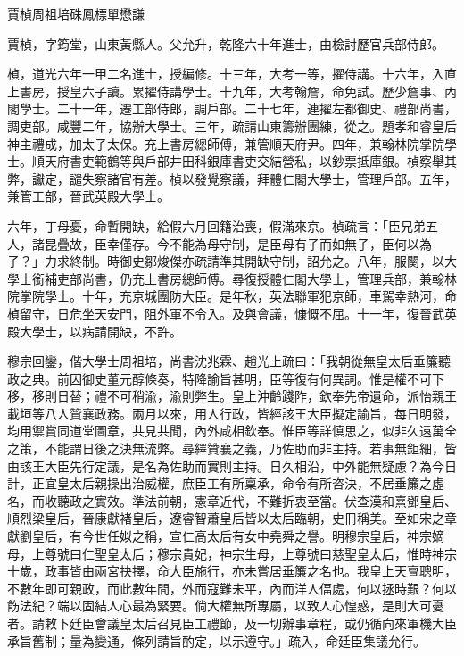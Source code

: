 
\begin{pinyinscope}
賈楨周祖培硃鳳標單懋謙

賈楨，字筠堂，山東黃縣人。父允升，乾隆六十年進士，由檢討歷官兵部侍郎。

楨，道光六年一甲二名進士，授編修。十三年，大考一等，擢侍講。十六年，入直上書房，授皇六子讀。累擢侍講學士。十九年，大考翰詹，命免試。歷少詹事、內閣學士。二十一年，遷工部侍郎，調戶部。二十七年，連擢左都御史、禮部尚書，調吏部。咸豐二年，協辦大學士。三年，疏請山東籌辦團練，從之。題孝和睿皇后神主禮成，加太子太保。充上書房總師傅，兼管順天府尹。四年，兼翰林院掌院學士。順天府書吏範鶴等與戶部井田科銀庫書吏交結營私，以鈔票抵庫銀。楨察舉其弊，讞定，譴失察諸官有差。楨以發覺察議，拜體仁閣大學士，管理戶部。五年，兼管工部，晉武英殿大學士。

六年，丁母憂，命暫開缺，給假六月回籍治喪，假滿來京。楨疏言：「臣兄弟五人，諸昆疊故，臣幸僅存。今不能為母守制，是臣母有子而如無子，臣何以為子？」力求終制。時御史鄒焌傑亦疏請準其開缺守制，詔允之。八年，服闋，以大學士銜補吏部尚書，仍充上書房總師傅。尋復授體仁閣大學士，管理兵部，兼翰林院掌院學士。十年，充京城團防大臣。是年秋，英法聯軍犯京師，車駕幸熱河，命楨留守，日危坐天安門，阻外軍不令入。及與會議，慷慨不屈。十一年，復晉武英殿大學士，以病請開缺，不許。

穆宗回鑾，偕大學士周祖培，尚書沈兆霖、趙光上疏曰：「我朝從無皇太后垂簾聽政之典。前因御史董元醇條奏，特降諭旨甚明，臣等復有何異詞。惟是權不可下移，移則日替；禮不可稍渝，渝則弊生。皇上沖齡踐阼，欽奉先帝遺命，派怡親王載垣等八人贊襄政務。兩月以來，用人行政，皆經該王大臣擬定諭旨，每日明發，均用禦賞同道堂圖章，共見共聞，內外咸相欽奉。惟臣等詳慎思之，似非久遠萬全之策，不能謂日後之決無流弊。尋繹贊襄之義，乃佐助而非主持。若事無鉅細，皆由該王大臣先行定議，是名為佐助而實則主持。日久相沿，中外能無疑慮？為今日計，正宜皇太后親操出治威權，庶臣工有所稟承，命令有所咨決，不居垂簾之虛名，而收聽政之實效。準法前朝，憲章近代，不難折衷至當。伏查漢和熹鄧皇后、順烈梁皇后，晉康獻褚皇后，遼睿智蕭皇后皆以太后臨朝，史冊稱美。至如宋之章獻劉皇后，有今世任姒之稱，宣仁高太后有女中堯舜之譽。明穆宗皇后，神宗嫡母，上尊號曰仁聖皇太后；穆宗貴妃，神宗生母，上尊號曰慈聖皇太后，惟時神宗十歲，政事皆由兩宮抉擇，命大臣施行，亦未嘗居垂簾之名也。我皇上天亶聰明，不數年即可親政，而此數年間，外而寇難未平，內而洋人偪處，何以拯時艱？何以飭法紀？端以固結人心最為緊要。倘大權無所專屬，以致人心惶惑，是則大可憂者。請敕下廷臣會議皇太后召見臣工禮節，及一切辦事章程，或仍循向來軍機大臣承旨舊制；量為變通，條列請旨酌定，以示遵守。」疏入，命廷臣集議允行。


\end{pinyinscope}
